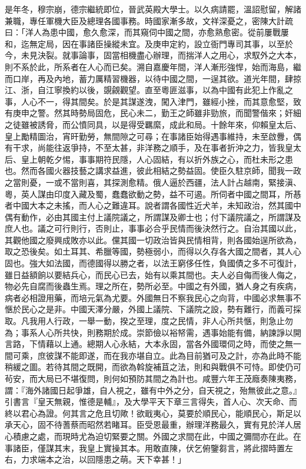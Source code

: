 \begin{pinyinscope}
是年冬，穆宗崩，德宗繼統即位，晉武英殿大學士。以久病請罷，溫詔慰留，解諸兼職，專任軍機大臣及總理各國事務。時國家漸多故，文祥深憂之，密陳大計疏曰：「洋人為患中國，愈久愈深，而其窺伺中國之間，亦愈熟愈密。從前屢戰屢和，迄無定局，因在事諸臣操縱未宜。及庚申定約，設立衙門專司其事，以至於今，未見決裂。就事論事，固當相機盡心辦理，而揣洋人之用心，求馭外之大本，則不系於此，所系者在人心而已矣。溯自嘉慶年間，洋人漸形強悍，始而海島，繼而口岸，再及內地，蓄力厲精習機器，以待中國之間，一逞其欲。道光年間，肆掠江、浙，自江寧換約以後，覬覦觀望。直至粵匪滋事，以為中國有此犯上作亂之事，人心不一，得其間矣。於是其謀遂洩，闖入津門，雖經小挫，而其意愈堅，致有庚申之警。然其時勢局固危，民心未二，勤王之師雖非勁旅，而聞警偕來；奸細之徒雖被誘脅，而公憤同具，以是得受羈縻，成此和局。十餘年來，仰賴皇太后、皇上勵精圖治，宵旰勤勞，無間隙之可尋；在事諸臣始得遇事維持，未至啟釁，偶有干求，尚能往返爭持，不至太甚，非洋務之順手，及在事者折沖之力，皆我皇太后、皇上朝乾夕惕，事事期符民隱，人心固結，有以折外族之心，而杜未形之患也。然而各國火器技藝之講求益進，彼此相結之勢益固。使臣久駐京師，聞我一政之當則憂，一或不當則喜，其探測愈精。俄人逼於西疆，法人計占越南，緊接滇、粵，英人謀由印度入藏及蜀，蠢蠢欲動之勢，益不可遏。所伺者中國之間耳，所惎者中國大本之未搖，而人心之難違耳。說者謂各國性近犬羊，未知政治，然其國中偶有動作，必由其國主付上議院議之，所謂謀及卿士也；付下議院議之，所謂謀及庶人也。議之可行則行，否則止，事事必合乎民情而後決然行之。自治其國以此，其觀他國之廢興成敗亦以此。儻其國一切政治皆與民情相背，則各國始逞所欲為，取之恐後矣。如土耳其、希臘等國，勢極弱小，而得以久存各大國之間者，其人心固也。強大如法國，而德國得以勝之者，以法王窮侈任性，負國債之多不可復計，雖日益額餉以要結兵心，而民心已去，始有以乘其間也。夫人必自侮而後人侮之，物必先自腐而後蟲生焉。理之所在，勢所必至。中國之有外國，猶人身之有疾病，病者必相證用藥，而培元氣為尤要。外國無日不察我民心之向背，中國必求無事不愜於民心之是非。中國天澤分嚴，外國上議院、下議院之設，勢有難行，而義可採取。凡我用人行政，一舉一動，揆之至理，度之民情，非人心所共愜，則急止勿為；事系人心所共快，則務期於成。崇節儉以裕帑需，遇事始能有備，納諫諍以開言路，下情藉以上通。總期人心永結，大本永固，當各外國環伺之時，而使之無一間可乘，庶彼謀不能即遂，而在我亦堪自立。此為目前猶可及之計，亦為此時不能稍緩之圖。若待其間之既開，而欲為斡旋補苴之法，則和與戰俱不可恃。即使仍可茍安，而大局已不堪復問，則何如預防其間之為計也。咸豐六年王茂廕奏陳夷務，謂：『海外諸國日起爭雄，自人視之，雖有中外之分，自天視之，殆無彼此之意。』引書言『皇天無親，惟德是輔』，及大學平天下章三言得失，首人心、次天命、而終以君心為證。何其言之危且切歟！欲戢夷心，莫要於順民心，能順民心，斯足以承天心，固不待蓍蔡而昭然若睹耳。臣受恩最重，辦理洋務最久，實有見於洋人居心積慮之處，而現時尤為迫切緊要之關。外國之求間在此，中國之彌間亦在此。在事諸臣，僅謀其末，我皇上實操其本。用敢直陳，伏乞俯鑒芻言，將此摺時置左右，力求端本之治，以回隱患之萌。天下幸甚！」


\end{pinyinscope}
